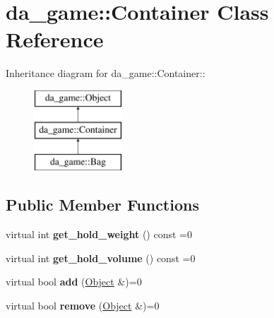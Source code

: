 \hypertarget{classda__game_1_1Container}{
\section{da\_\-game::Container Class Reference}
\label{classda__game_1_1Container}
}
Inheritance diagram for da\_\-game::Container::\begin{figure}[H]
\begin{center}
\leavevmode
\includegraphics[height=3cm]{classda__game_1_1Container}
\end{center}
\end{figure}
\subsection*{Public Member Functions}
\begin{DoxyCompactItemize}
\item 
\hypertarget{classda__game_1_1Container_a8791f5bdac70b65d978ac0184ed48525}{
virtual int {\bfseries get\_\-hold\_\-weight} () const =0}
\label{classda__game_1_1Container_a8791f5bdac70b65d978ac0184ed48525}

\item 
\hypertarget{classda__game_1_1Container_a884311719474a432f186dfc803e15873}{
virtual int {\bfseries get\_\-hold\_\-volume} () const =0}
\label{classda__game_1_1Container_a884311719474a432f186dfc803e15873}

\item 
\hypertarget{classda__game_1_1Container_a37fab4911cc993db3f4e26c4e6e95eba}{
virtual bool {\bfseries add} (\hyperlink{classda__game_1_1Object}{Object} \&)=0}
\label{classda__game_1_1Container_a37fab4911cc993db3f4e26c4e6e95eba}

\item 
\hypertarget{classda__game_1_1Container_a8bb5c906abd5f6df854e6eab8831305e}{
virtual bool {\bfseries remove} (\hyperlink{classda__game_1_1Object}{Object} \&)=0}
\label{classda__game_1_1Container_a8bb5c906abd5f6df854e6eab8831305e}

\end{DoxyCompactItemize}
